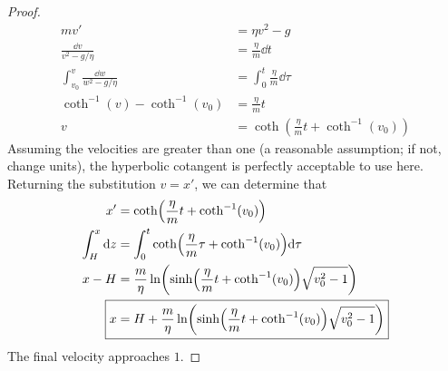 \documentclass[../psets.tex]{subfiles}
\begin{document}
\begin{enumerate}
\begin{proof}
        \begin{align*}
            mv' &= \eta v^2-g\\
            \frac{\dd{v}}{v^2-g/\eta} &= \frac{\eta}{m}\dd{t}\\
            \int_{v_0}^v\frac{\dd{w}}{w^2-g/\eta} &= \int_0^t\frac{\eta}{m}\dd{\tau}\\
            \coth^{-1}(v)-\coth^{-1}(v_0) &= \frac{\eta}{m}t\\
            v &= \coth(\frac{\eta}{m}t+\coth^{-1}(v_0))
        \end{align*}
        Assuming the velocities are greater than one (a reasonable assumption; if not, change units), the hyperbolic cotangent is perfectly acceptable to use here. Returning the substitution $v=x'$, we can determine that
        \begin{align*}
            x' &= \coth(\frac{\eta}{m}t+\coth^{-1}(v_0))\\
            \int_H^x\dd{z} &= \int_0^t\coth(\frac{\eta}{m}\tau+\coth^{-1}(v_0))\dd\tau\\
            x-H &= \frac{m}{\eta}\ln(\sinh(\frac{\eta}{m}t+\coth^{-1}(v_0))\sqrt{v_0^2-1})\\
            \Aboxed{x &= H+\frac{m}{\eta}\ln(\sinh(\frac{\eta}{m}t+\coth^{-1}(v_0))\sqrt{v_0^2-1})}
        \end{align*}
        The final velocity approaches $\boxed{1}$.
    \end{proof}
\end{enumerate}
\end{document}
